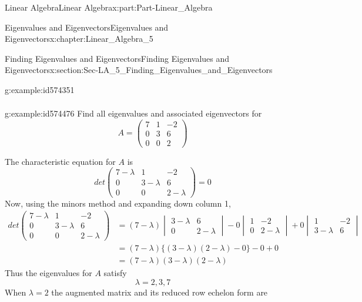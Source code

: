 \documentclass[oneside,10pt,]{book}
\numberwithin{equation}{section}
\newcommand{\amp}{&}
\begin{document}
\begin{partptx}{Linear Algebra}{}{Linear Algebra}{}{}{x:part:Part-Linear_Algebra}
\begin{chapterptx}{Eigenvalues and Eigenvectors}{}{Eigenvalues and Eigenvectors}{}{}{x:chapter:Linear_Algebra_5}
\begin{sectionptx}{Finding Eigenvalues and Eigenvectors}{}{Finding Eigenvalues and Eigenvectors}{}{}{x:section:Sec-LA_5_Finding_Eigenvalues_and_Eigenvectors}
\begin{example}{}{g:example:id574351}
\begin{align*}
\end{align*}
%
\end{example}
\begin{example}{}{g:example:id574476}%
Find all eigenvalues and associated eigenvectors for%
\begin{equation*}
A=\begin{pmatrix} 7 \amp 1 \amp -2 \\ 0 \amp 3 \amp 6 \\ 0 \amp 0 \amp 2 \end{pmatrix}
\end{equation*}
%
\par\smallskip%
\noindent\hypertarget{g:solution:id574454}{}The characteristic equation for \(A\) is%
\begin{equation*}
det\begin{pmatrix} 7-\lambda \amp 1 \amp -2 \\ 0 \amp 3-\lambda \amp 6 \\ 0 \amp 0 \amp 2-\lambda \end{pmatrix}=0
\end{equation*}
Now, using the minors method and expanding down column 1,%
\begin{align*}
det\begin{pmatrix} 7-\lambda \amp 1 \amp -2 \\ 0 \amp 3-\lambda \amp 6 \\ 0 \amp 0\amp 2-\lambda \end{pmatrix} \amp =(7-\lambda)\begin{vmatrix} 3-\lambda \amp 6 \\ 0 \amp 2-\lambda \end{vmatrix}-0\begin{vmatrix} 1 \amp -2 \\ 0 \amp 2-\lambda \end{vmatrix}+0\begin{vmatrix} 1 \amp -2 \\ 3-\lambda \amp 6 \end{vmatrix} \\
\amp = (7-\lambda)\{(3-\lambda)(2-\lambda)-0\}-0+0\\
\amp = (7-\lambda)(3-\lambda)(2-\lambda)
\end{align*}
Thus the eigenvalues for \(A\) satisfy%
\begin{equation*}
\lambda=2,3,7
\end{equation*}
When \(\lambda=2\) the augmented matrix and its reduced row echelon form are%
\begin{equation*}

\end{equation*}
\end{example}
\end{sectionptx}
\end{chapterptx}
\end{partptx}
\end{document}
